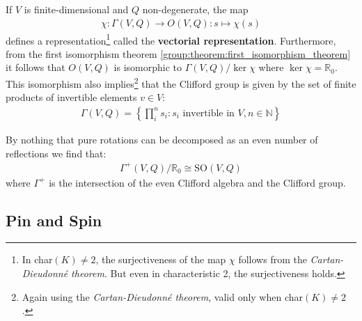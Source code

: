 	\begin{property}
		If $V$ is finite-dimensional and $Q$ non-degenerate, the map
		\begin{gather}
			\chi:\Gamma(V, Q)\rightarrow O(V, Q): s\mapsto\chi(s)
		\end{gather}
		defines a representation\footnote{In char$(K)\neq2$, the surjectiveness of the map $\chi$ follows from the \textit{Cartan-Dieudonn\'e theorem}. But even in characteristic 2, the surjectiveness holds.} called the \textbf{vectorial representation}. Furthermore, from the first isomorphism theorem \ref{group:theorem:first_isomorphism_theorem} it follows that $O(V, Q)$ is isomorphic to $\Gamma(V, Q)/\ker\chi$ where $\ker\chi = \mathbb{R}_0$. This isomorphism also implies\footnote{Again using the \textit{Cartan-Dieudonn\'e theorem}, valid only when char$(K)\neq2$.} that the Clifford group is given by the set of finite products of invertible elements $v\in V$:
		\begin{gather}
			\Gamma(V, Q) = \left\{\prod_i^n s_i : s_i\text{ invertible in }V, n\in\mathbb{N}\right\}
		\end{gather}
	\end{property}
	\begin{result}
		By nothing that pure rotations can be decomposed as an even number of reflections we find that:
		\begin{gather}
			\Gamma^+(V, Q)/\mathbb{R}_0 \cong \text{SO}(V, Q)
		\end{gather}
		where $\Gamma^+$ is the intersection of the even Clifford algebra and the Clifford group.
	\end{result}

\subsection{Pin and Spin}

